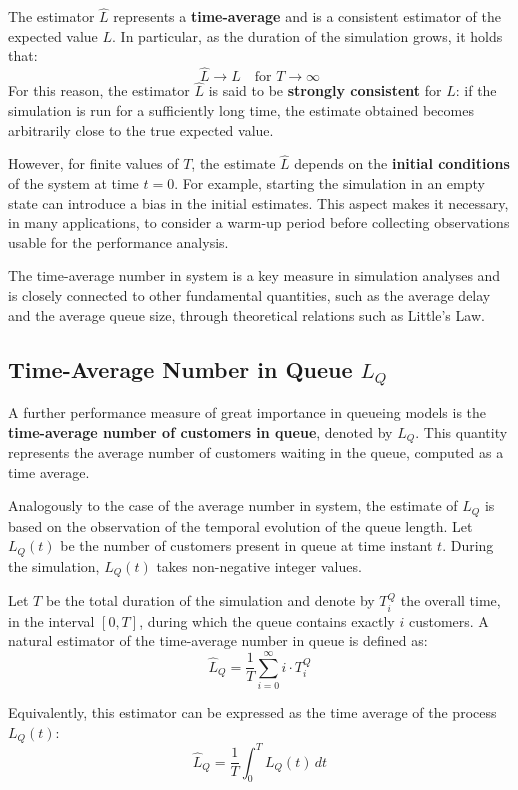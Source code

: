 The estimator $\hat{L}$ represents a \textbf{time-average} and is a consistent estimator of the expected value $L$. In particular, as the duration of the simulation grows, it holds that:
\[
\hat{L} \longrightarrow L \quad \text{for } T \to \infty
\]
For this reason, the estimator $\hat{L}$ is said to be \textbf{strongly consistent} for $L$: if the simulation is run for a sufficiently long time, the estimate obtained becomes arbitrarily close to the true expected value.

However, for finite values of $T$, the estimate $\hat{L}$ depends on the \textbf{initial conditions} of the system at time $t = 0$. For example, starting the simulation in an empty state can introduce a bias in the initial estimates. This aspect makes it necessary, in many applications, to consider a warm-up period before collecting observations usable for the performance analysis.

The time-average number in system is a key measure in simulation analyses and is closely connected to other fundamental quantities, such as the average delay and the average queue size, through theoretical relations such as Little’s Law.

\subsection{Time-Average Number in Queue $L_Q$}

A further performance measure of great importance in queueing models is the \textbf{time-average number of customers in queue}, denoted by $L_Q$. This quantity represents the average number of customers waiting in the queue, computed as a time average.

Analogously to the case of the average number in system, the estimate of $L_Q$ is based on the observation of the temporal evolution of the queue length. Let $L_Q(t)$ be the number of customers present in queue at time instant $t$. During the simulation, $L_Q(t)$ takes non-negative integer values.

Let $T$ be the total duration of the simulation and denote by $T_i^Q$ the overall time, in the interval $[0, T]$, during which the queue contains exactly $i$ customers. A natural estimator of the time-average number in queue is defined as:
\[
\hat{L}_Q = \frac{1}{T} \sum_{i=0}^{\infty} i \cdot T_i^Q
\]

Equivalently, this estimator can be expressed as the time average of the process $L_Q(t)$:
\[
\hat{L}_Q = \frac{1}{T} \int_{0}^{T} L_Q(t)\, dt
\]

